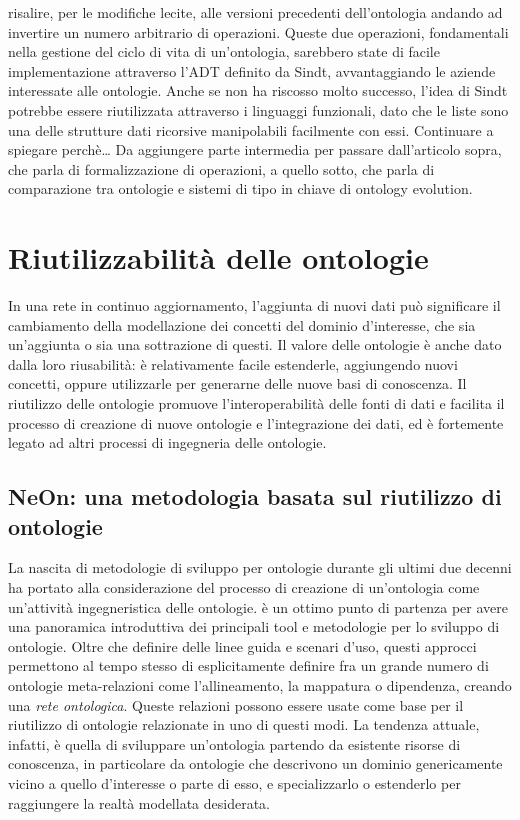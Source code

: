 risalire, per le modifiche lecite, alle versioni precedenti dell'ontologia andando ad invertire un numero arbitrario di operazioni.
Queste due operazioni, fondamentali nella gestione del ciclo di vita di un'ontologia, sarebbero state di facile implementazione attraverso l'ADT definito da Sindt, avvantaggiando le aziende interessate alle ontologie. Anche se non ha riscosso molto successo, l'idea di Sindt potrebbe essere riutilizzata attraverso i linguaggi funzionali, dato che le liste sono una delle strutture dati ricorsive manipolabili facilmente con essi. Continuare a spiegare perchè…
Da aggiungere parte intermedia per passare dall'articolo sopra, che parla di formalizzazione di operazioni, a quello sotto, che parla di comparazione tra ontologie e sistemi di tipo in chiave di ontology evolution.
\evv

\section{Riutilizzabilità delle ontologie}
\label{sec:OntoReuse}
In una rete in continuo aggiornamento, l'aggiunta di nuovi dati può significare il cambiamento della modellazione dei concetti del dominio d'interesse, che sia un'aggiunta o sia una sottrazione di questi. Il valore delle ontologie è anche dato dalla loro riusabilità: è relativamente facile estenderle, aggiungendo nuovi concetti, oppure utilizzarle per generarne delle nuove basi di conoscenza. Il riutilizzo delle ontologie promuove l'interoperabilità delle fonti di dati e facilita il processo di creazione di nuove ontologie e l'integrazione dei dati, ed è fortemente legato ad altri processi di ingegneria delle ontologie.
\subsection{NeOn: una metodologia basata sul riutilizzo di ontologie}
La nascita di metodologie di sviluppo per ontologie durante gli ultimi due decenni ha portato alla considerazione del processo di creazione di un'ontologia come un'attività ingegneristica delle ontologie. \cite{iqbal2013analysis} è un ottimo punto di partenza per avere una panoramica introduttiva dei principali tool e metodologie per lo sviluppo di ontologie. Oltre che definire delle linee guida e scenari d'uso, questi approcci permettono al tempo stesso di esplicitamente definire fra un grande numero di ontologie meta-relazioni  come l'allineamento, la mappatura \cite{choi2006Mapping} o dipendenza, creando una \textit{rete ontologica}. Queste relazioni possono essere usate come base per il riutilizzo di ontologie relazionate in uno di questi modi. La tendenza attuale, infatti, è quella di sviluppare un'ontologia partendo da esistente risorse di conoscenza, in particolare da ontologie che descrivono un dominio genericamente vicino a quello d'interesse o parte di esso, e specializzarlo o estenderlo per raggiungere la realtà modellata desiderata.


